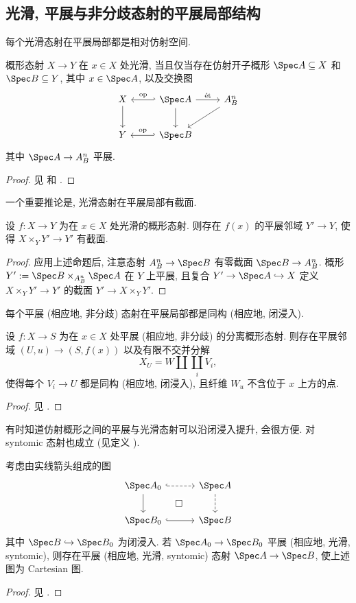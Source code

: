 \subsection{光滑, 平展与非分歧态射的平展局部结构}\label{src:A.3.2-subsection}
每个光滑态射在平展局部都是相对仿射空间.
\begin{proposition}[光滑态射的局部结构]\label{src:A.3.4}
概形态射 $X\to Y$ 在 $x\in X$ 处光滑, 当且仅当存在仿射开子概形 $\Spec A\subseteq X$ 和 $\Spec B\subseteq Y$, 其中 $x\in\Spec A$, 以及交换图
\[
\begin{tikzcd}[column sep=2.5em,row sep=2em]
X\arrow[d]&\Spec A\arrow[l,hook',"\mathrm{op}"']\arrow[d]\arrow[r,"\text{ét}"]&\mathbb A_B^n\arrow[dl]\\
Y&\Spec B\arrow[l,hook',"\mathrm{op}"']&
\end{tikzcd}
\]
其中 $\Spec A\to\mathbb A_B^n$ 平展.
\end{proposition}
\begin{proof}
见 \cite[Tag 039P]{SP} 和 \cite[IV$_4$.$17.11.4$]{EGA}.
\end{proof}
一个重要推论是, 光滑态射在平展局部有截面.
\begin{corollary}\label{src:A.3.5}
设 $f:X\to Y$ 为在 $x\in X$ 处光滑的概形态射. 则存在 $f(x)$ 的平展邻域 $Y'\to Y$, 使得 $X\times_Y Y'\to Y'$ 有截面.
\end{corollary}
\begin{proof}
应用上述命题后, 注意态射 $\mathbb A_B^n\to\Spec B$ 有零截面 $\Spec B\to\mathbb A_B^n$. 概形 $Y':=\Spec B\times_{\mathbb A_B^n}\Spec A$ 在 $Y$ 上平展, 且复合 $Y'\to\Spec A\hookrightarrow X$ 定义 $X\times_Y Y'\to Y'$ 的截面 $Y'\to X\times_Y Y'$.
\end{proof}
每个平展 (相应地, 非分歧) 态射在平展局部都是同构 (相应地, 闭浸入).
\begin{proposition}\label{src:A.3.6}
设 $f:X\to S$ 为在 $x\in X$ 处平展 (相应地, 非分歧) 的分离概形态射. 则存在平展邻域 $(U,u)\to(S,f(x))$ 以及有限不交并分解
\[
X_U=W\coprod\coprod_i V_i,
\]
使得每个 $V_i\to U$ 都是同构 (相应地, 闭浸入), 且纤维 $W_u$ 不含位于 $x$ 上方的点.
\end{proposition}
\begin{proof}
见 \cite[Tags 04HM, 04HG]{SP}.
\end{proof}
有时知道仿射概形之间的平展与光滑态射可以沿闭浸入提升, 会很方便. 对 syntomic 态射也成立 (见定义 ).
\begin{proposition}\label{src:A.3.7}
考虑由实线箭头组成的图
\[
\begin{tikzcd}[column sep=3em,row sep=2em]
\Spec A_0\arrow[d]\arrow[r,hook,dashed]&\Spec A\arrow[d,dashed]\\
\Spec B_0\arrow[r,hook]\arrow[ur,phantom,"\square" description]&\Spec B
\end{tikzcd}
\]
其中 $\Spec B\hookrightarrow\Spec B_0$ 为闭浸入. 若 $\Spec A_0\to\Spec B_0$ 平展 (相应地, 光滑, syntomic), 则存在平展 (相应地, 光滑, syntomic) 态射 $\Spec A\to\Spec B$, 使上述图为 Cartesian 图.
\end{proposition}
\begin{proof}
见 \cite[Tags 04D1, 07M8]{SP}.
\end{proof}

